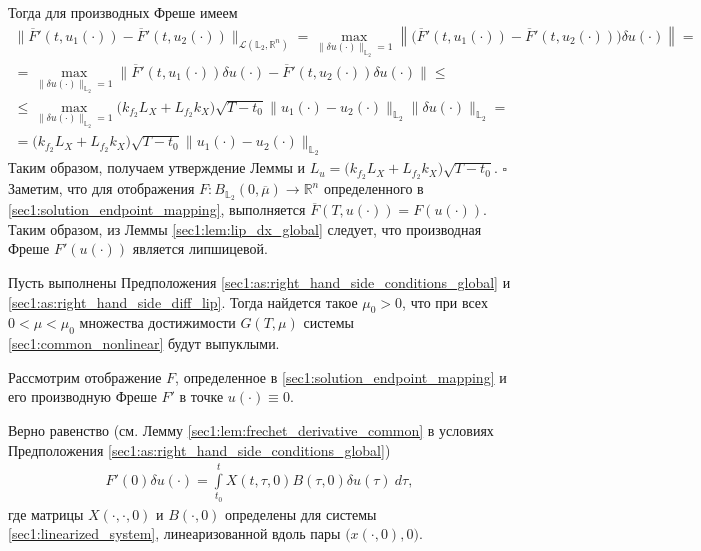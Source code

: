 \documentclass[../main.tex]{subfiles}
\begin{document}
Тогда для производных Фреше имеем
\begin{gather*}
	 \Big\| \overline{F}'(t, u_1(\cdot)) - \overline{F}'(t, u_2(\cdot)) \Big\|_{\mathcal{L}(\mathbb{L}_2, \mathbb{R}^n)} = 
	 \max\limits_{\|\delta u(\cdot)\|_{\mathbb{L}_2} = 1} \left\| \Big(  \overline{F}'(t, u_1(\cdot)) - \overline{F}'(t, u_2(\cdot)) \Big) \delta u(\cdot) \right\| = \\ =
	  \max\limits_{\|\delta u(\cdot)\|_{\mathbb{L}_2} = 1} \Big\| \overline{F}'(t, u_1(\cdot)) \delta u(\cdot) - \overline{F}'(t, u_2(\cdot)) \delta u(\cdot) \Big\| \leqslant \\ \leqslant  \max\limits_{\|\delta u(\cdot)\|_{\mathbb{L}_2} = 1} \Big( k_{f_2} L_X + L_{f_2} k_X \Big) \sqrt{T - t_0} \| u_1(\cdot) - u_2(\cdot) \|_{\mathbb{L}_2}  \| \delta u(\cdot) \|_{\mathbb{L}_2} = \\ =
	   \Big( k_{f_2} L_X + L_{f_2} k_X \Big) \sqrt{T - t_0} \| u_1(\cdot) - u_2(\cdot) \|_{\mathbb{L}_2}
\end{gather*}
Таким образом, получаем  утверждение Леммы и $L_u = \Big( k_{f_2} L_X + L_{f_2} k_X \Big) \sqrt{T - t_0} $.
\hfill$\square$\\[1ex]%
    
Заметим, что для отображения $F: B_{\mathbb{L}_2}(0,\overline{\mu}) \to \mathbb{R}^n$ определенного в \eqref{sec1:solution_endpoint_mapping}, выполняется $\overline{F}(T, u(\cdot)) = F(u(\cdot))$.
Таким образом, из Леммы \ref{sec1:lem:lip_dx_global} следует, что производная Фреше $F'(u(\cdot)) $ является липшицевой. 
    
\begin{theorem}\label{sec1:th:small_control_convexity}
    Пусть выполнены Предположения \ref{sec1:as:right_hand_side_conditions_global} и \ref{sec1:as:right_hand_side_diff_lip}.
    Тогда найдется такое $\mu_0 > 0$, что при всех $0 < \mu <  \mu_0 $ множества достижимости $G(T, \mu)$ системы \eqref{sec1:common_nonlinear} будут выпуклыми.
\end{theorem}
\doc
Рассмотрим отображение $F$, определенное в \eqref{sec1:solution_endpoint_mapping} и его производную Фреше $F'$ в точке $u(\cdot) \equiv 0$. 
    
Верно равенство (см.  Лемму \ref{sec1:lem:frechet_derivative_common} в условиях Предположения  \ref{sec1:as:right_hand_side_conditions_global})
\begin{gather*}
    F'(0) \delta u(\cdot) =  \int\limits_{t_0}^{t} X(t, \tau, 0) B(\tau, 0) \delta u(\tau) \ d\tau,
\end{gather*}
где матрицы $X(\cdot, \cdot, 0)$  и $B(\cdot, 0)$ определены для системы \eqref{sec1:linearized_system}, линеаризованной вдоль пары $\Big(x(\cdot, 0), 0\Big) $.
    
\end{document}
